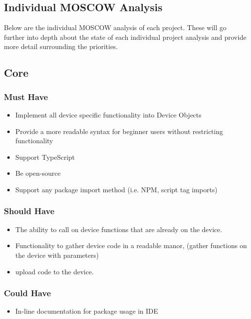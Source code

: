 \documentclass{l4proj}
\begin{document}
\begin{appendices}
\chapter{Individual MOSCOW Analysis}


\label{appendix:MOSCOWAnalysis}

Below are the individual MOSCOW analysis of each project. These will go further into depth about the state of each individual project analysis and provide more detail surrounding the priorities.


\section{Core}
\subsection{Must Have}
\begin{itemize}
    \item Implement all device specific functionality into Device Objects
    \item Provide a more readable syntax for beginner users without restricting functionality
    \item Support TypeScript
    \item Be open-source
    \item Support any package import method (i.e. NPM, script tag imports)
\end{itemize}
\subsection{Should Have}
\begin{itemize}
    \item The ability to call on device functions that are already on the device.
    \item Functionality to gather device code in a readable manor, (gather functions on the device with parameters)
    \item upload code to the device.
\end{itemize}
\subsection{Could Have}
\begin{itemize}
    \item In-line documentation for package usage in IDE
\end{itemize}


\end{appendices}
\end{document}
